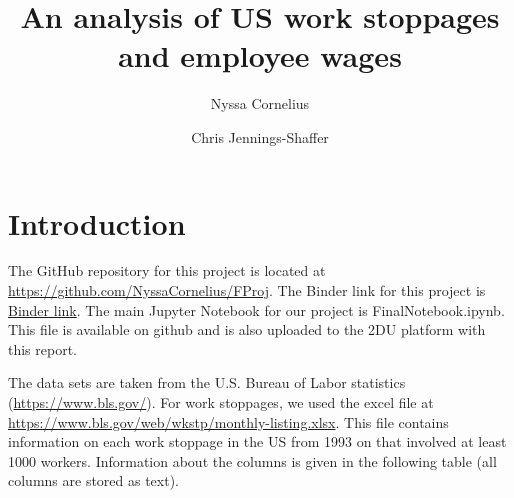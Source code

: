 \documentclass[reqno,11pt]{amsart}
\title{An analysis of US work stoppages and employee wages}
\author[N. Cornelius]{Nyssa Cornelius}
\author[C. Jennings-Shaffer]{Chris  Jennings-Shaffer}
\begin{document}
\allowdisplaybreaks
\maketitle



\section{Introduction}

The GitHub repository for this project is located at
\url{https://github.com/NyssaCornelius/FProj}. The Binder link for this project
is \href{https://mybinder.org/v2/gh/NyssaCornelius/FProj/main}{Binder link}.
The main Jupyter Notebook for our project is FinalNotebook.ipynb. This file is available
on github and is also uploaded to the 2DU platform with this report.


The data sets are taken from the U.S. Bureau of Labor statistics (\url{https://www.bls.gov/}). 
For work stoppages, we used the excel file at \url{https://www.bls.gov/web/wkstp/monthly-listing.xlsx}.
This file contains information on each work stoppage in the US from 1993 on that involved at
least 1000 workers. Information about the columns is given in the following table
(all columns are stored as text).
\end{document}
